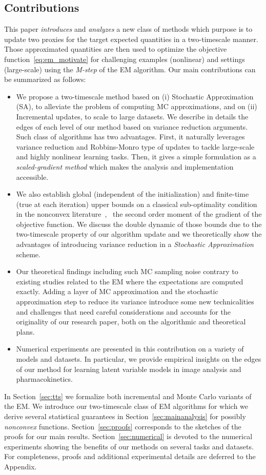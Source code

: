 \documentclass[12pt]{article}
\begin{document}
\subsection{Contributions}
This paper \textit{introduces} and \textit{analyzes} a new class of methods which purpose is to update two proxies for the target expected quantities in a two-timescale manner. 
Those approximated quantities are then used to optimize the objective function~\eqref{eq:em_motivate} for challenging examples (nonlinear) and settings (large-scale) using the \textit{M-step} of the EM algorithm.
Our main contributions can be summarized as follows:
\begin{itemize}
\item We propose a two-timescale method based on (i) Stochastic Approximation (SA), to alleviate the problem of computing MC approximations, and on (ii) Incremental updates, to scale to large datasets. We describe in details the edges of each level of our method based on variance reduction arguments. Such class of algorithms has two advantages. First, it naturally leverages variance reduction and Robbins-Monro type of updates to tackle large-scale and highly nonlinear learning tasks. Then, it gives a simple formulation as a \textit{scaled-gradient method} which makes the analysis and implementation accessible.
\item We also establish global (independent of the initialization) and finite-time (true at each iteration) upper bounds on a classical sub-optimality condition in the nonconvex literature~\citep{jain2017non, ghadimi2013stochastic}, \ie\ the second order moment of the gradient of the objective function. 
We discuss the double dynamic of those bounds due to the two-timescale property of our algorithm update and we theoretically show the advantages of introducing variance reduction in a \emph{Stochastic Approximation}~\citep{robbins1951stochastic} scheme.
\item Our theoretical findings including such MC sampling noise contrary to existing studies related to the EM where the expectations are computed exactly. 
Adding a layer of MC approximation and the stochastic approximation step to reduce its variance introduce some new technicalities and challenges that need careful considerations and accounts for the originality of our research paper, both on the algorithmic and theoretical plans.
\item Numerical experiments are presented in this contribution on a variety of models and datasets. In particular, we provide empirical insights on the edges of our method for learning latent variable models in image analysis and pharmacokinetics.
\end{itemize}
In Section~\ref{sec:tts} we formalize both incremental and Monte Carlo variants of the EM. 
We introduce our two-timescale class of EM algorithms for which we derive several statistical guarantees in Section~\ref{sec:mainanalysis} for possibly \textit{nonconvex} functions.
Section~\ref{sec:proofs} corresponds to the sketches of the proofs for our main results.
Section~\ref{sec:numerical} is devoted to the numerical experiments showing the benefits of our methods on several tasks and datasets.
For completeness, proofs and additional experimental details are deferred to the Appendix.
\end{document}
